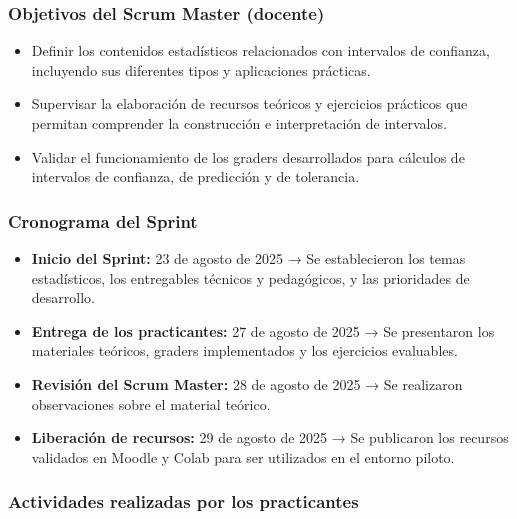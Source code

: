 \documentclass[letter,oneside,12pt,spanish]{report}
\begin{document}
\subsubsection*{Objetivos del Scrum Master (docente)}
\begin{itemize}
	\item Definir los contenidos estadísticos relacionados con intervalos de confianza, incluyendo sus diferentes tipos y aplicaciones prácticas.
	\item Supervisar la elaboración de recursos teóricos y ejercicios prácticos que permitan comprender la construcción e interpretación de intervalos.
	\item Validar el funcionamiento de los graders desarrollados para cálculos de intervalos de confianza, de predicción y de tolerancia.
\end{itemize}

\subsubsection*{Cronograma del Sprint}
\begin{itemize}
	\item \textbf{Inicio del Sprint:} 23 de agosto de 2025 → Se establecieron los temas estadísticos, los entregables técnicos y pedagógicos, y las prioridades de desarrollo.
	\item \textbf{Entrega de los practicantes:} 27 de agosto de 2025 → Se presentaron los materiales teóricos, graders implementados y los ejercicios evaluables.
	\item \textbf{Revisión del Scrum Master:} 28 de agosto de 2025 → Se realizaron observaciones sobre el material teórico.
	\item \textbf{Liberación de recursos:} 29 de agosto de 2025 → Se publicaron los recursos validados en Moodle y Colab para ser utilizados en el entorno piloto.
\end{itemize}

\subsubsection*{Actividades realizadas por los practicantes}
\end{document}
